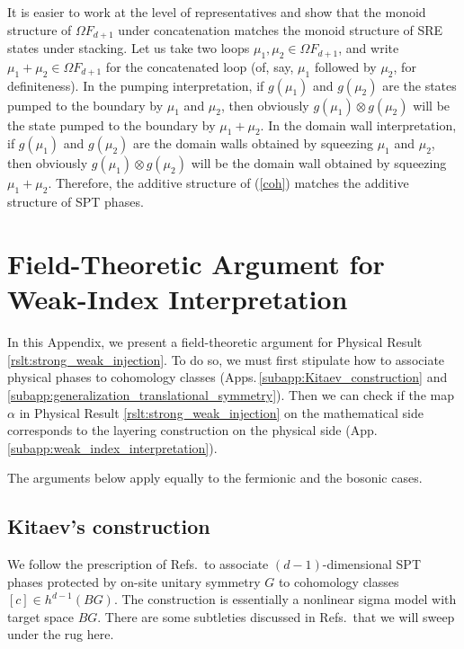 \documentclass[sort&compress]{elsarticle}
\theoremstyle{theoremstyle}
\theoremstyle{framedtheoremstyle}
\theoremstyle{definitionstyle}
\theoremstyle{definitionstyle}
\theoremstyle{definitionstyle}
\theoremstyle{definitionstyle}
\theoremstyle{nameddefinitionstyle}
\theoremstyle{framednameddefinitionstyle}
\theoremstyle{proofstyle}
\theoremstyle{definitionstyle}
\newcommand{\paren}[1]{\left( #1 \right)}
\newcommand{\brackets}[1]{\left[ #1 \right]}
\begin{document}
\begin{appendices}
It is easier to work at the level of representatives and show that the monoid structure of $\Omega F_{d+1}$ under concatenation matches the monoid structure of SRE states under stacking. Let us take two loops $\mu_1, \mu_2 \in \Omega F_{d+1}$, and write $\mu_1 + \mu_2 \in \Omega F_{d+1}$ for the concatenated loop (of, say, $\mu_1$ followed by $\mu_2$, for definiteness). In the pumping interpretation, if $g\paren{\mu_1}$ and $g\paren{\mu_2}$ are the states pumped to the boundary by $\mu_1$ and $\mu_2$, then obviously $g\paren{\mu_1} \otimes g\paren{\mu_2}$ will be the state pumped to the boundary by $\mu_1 + \mu_2$. In the domain wall interpretation, if $g\paren{\mu_1}$ and $g\paren{\mu_2}$ are the domain walls obtained by squeezing $\mu_1$ and $\mu_2$, then obviously $g\paren{\mu_1} \otimes g\paren{\mu_2}$ will be the domain wall obtained by squeezing $\mu_1 + \mu_2$. Therefore, the additive structure of (\ref{coh}) matches the additive structure of SPT phases.













\section{Field-Theoretic Argument for Weak-Index Interpretation\label{app:field_theoretic_argument_weak_index_interpretation}}

In this Appendix, we present a field-theoretic argument for Physical Result \ref{rslt:strong_weak_injection}. To do so, we must first stipulate how to associate physical phases to cohomology classes (Apps.\,\ref{subapp:Kitaev_construction} and \ref{subapp:generalization_translational_symmetry}). Then we can check if the map $\alpha$ in Physical Result \ref{rslt:strong_weak_injection} on the mathematical side corresponds to the layering construction on the physical side (App.\,\ref{subapp:weak_index_interpretation}).

The arguments below apply equally to the fermionic and the bosonic cases.

\subsection{Kitaev's construction \label{subapp:Kitaev_construction}}

We follow the prescription of Refs.\,\cite{Kitaev_Stony_Brook_2013_SRE, Kitaev_KITP} to associate $(d-1)$-dimensional SPT phases protected by on-site unitary symmetry $G$ to cohomology classes $\brackets{c} \in h^{d-1} \paren{BG}$. The construction is essentially a nonlinear sigma model with target space $BG$. There are some subtleties discussed in Refs.\,\cite{Kitaev_Stony_Brook_2013_SRE, Kitaev_KITP} that we will sweep under the rug here.


\end{appendices}
\end{document}
